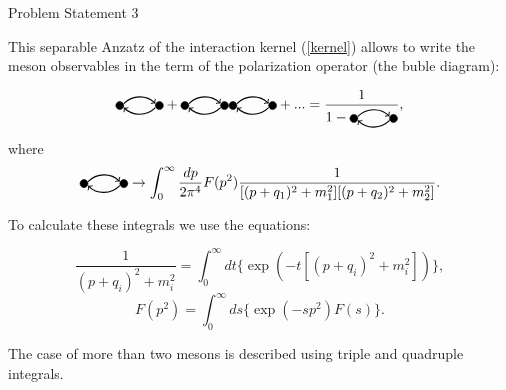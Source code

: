 \documentclass[9pt]{beamer}
\begin{document}
\begin{frame}{Problem Statement 3}

This separable Anzatz of the interaction kernel (\ref{kernel}) allows to write the meson observables in the term of the polarization operator (the buble diagram): 

\begin{equation}
        \tikz[baseline=-0.5ex]{
        \filldraw (0, 0) circle (0.1cm);
        \filldraw (1, 0) circle (0.1cm);
        \draw[->, thick] (0.1, 0.05) to[out=45, in=135] (0.9, 0.05);
        \draw[<-, thick] (0.1, -0.05) to[out=-45, in=-135] (0.9, -0.05);
    } + \tikz[baseline=-0.5ex]{
        \filldraw (0, 0) circle (0.1cm);
        \filldraw (1, 0) circle (0.1cm);
        \draw[->, thick] (0.1, 0.05) to[out=45, in=135] (0.9, 0.05);
        \draw[<-, thick] (0.1, -0.05) to[out=-45, in=-135] (0.9, -0.05);
    }\tikz[baseline=-0.5ex]{
        \filldraw (0, 0) circle (0.1cm);
        \filldraw (1, 0) circle (0.1cm);
        \draw[->, thick] (0.1, 0.05) to[out=45, in=135] (0.9, 0.05);
        \draw[<-, thick] (0.1, -0.05) to[out=-45, in=-135] (0.9, -0.05);
    } + ... = \frac{1}{1 - \tikz[baseline=-0.5ex]{
        \filldraw (0, 0) circle (0.1cm);
        \filldraw (1, 0) circle (0.1cm);
        \draw[->, thick] (0.1, 0.05) to[out=45, in=135] (0.9, 0.05);
        \draw[<-, thick] (0.1, -0.05) to[out=-45, in=-135] (0.9, -0.05);
    }},
\end{equation}
where 
\begin{equation}
        \tikz[baseline=-0.5ex]{
        \filldraw (0, 0) circle (0.1cm);
        \filldraw (1, 0) circle (0.1cm);
        \draw[->, thick] (0.1, 0.05) to[out=45, in=135] (0.9, 0.05);
        \draw[<-, thick] (0.1, -0.05) to[out=-45, in=-135] (0.9, -0.05);
    } \to \int_{0}^{\infty}\frac{dp}{2\pi^4}F(p^2)\frac{1}{[(p + q_1)^2 + m_1^2][(p + q_2)^2 + m_2^2]}.
\end{equation}

To calculate these integrals we use the equations:

\begin{equation}
    \frac{1}{(p + q_i)^2 + m_i^2} = \int_{0}^{\infty}dt\{\exp(-t[(p + q_i)^2 + m_i^2])\}, 
\end{equation}
\begin{equation}
    F(p^2) = \int_{0}^{\infty}ds\{\exp(-sp^2)F(s)\} .
\end{equation}

The case of more than two mesons is described using triple and quadruple integrals.

\end{frame}
\end{document}
